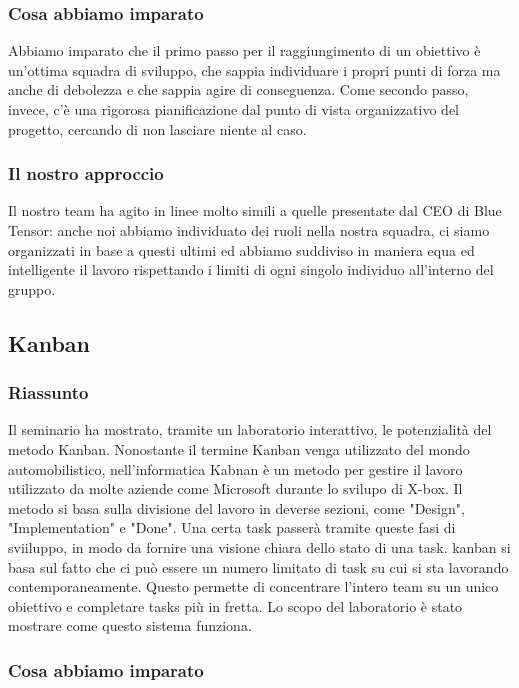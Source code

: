 \documentclass{report}
\begin{document}
\subsubsection*{Cosa abbiamo imparato}
Abbiamo imparato che il primo passo per il raggiungimento di un obiettivo è un'ottima squadra di sviluppo, che sappia individuare i propri punti di forza ma anche di debolezza e che sappia agire di conseguenza. Come secondo passo, invece, c'è una rigorosa pianificazione dal punto di vista organizzativo del progetto, cercando di non lasciare niente al caso.

\subsubsection*{Il nostro approccio}
Il nostro team ha agito in linee molto simili a quelle presentate dal CEO di Blue Tensor: anche noi abbiamo individuato dei ruoli nella nostra squadra, ci siamo organizzati in base a questi ultimi ed abbiamo suddiviso in maniera equa ed intelligente il lavoro rispettando i limiti di ogni singolo individuo all'interno del gruppo.


\subsection{Kanban}
\subsubsection*{Riassunto}

Il seminario ha mostrato, tramite un laboratorio interattivo, le potenzialità del metodo Kanban. Nonostante il termine Kanban venga utilizzato del mondo automobilistico, nell'informatica Kabnan è un metodo per gestire il lavoro utilizzato da molte aziende come Microsoft durante lo svilupo di X-box. Il metodo si basa sulla divisione del lavoro in deverse sezioni, come "Design", "Implementation" e "Done". Una certa task passerà tramite queste fasi di sviiluppo, in modo da fornire una visione chiara dello stato di una task. kanban si basa sul fatto che ci può essere un numero limitato di task su cui si sta lavorando contemporaneamente. Questo permette di concentrare l'intero team su un unico obiettivo e completare tasks più in fretta. Lo scopo del laboratorio è stato mostrare come questo sistema funziona.

\subsubsection*{Cosa abbiamo imparato}
\end{document}
